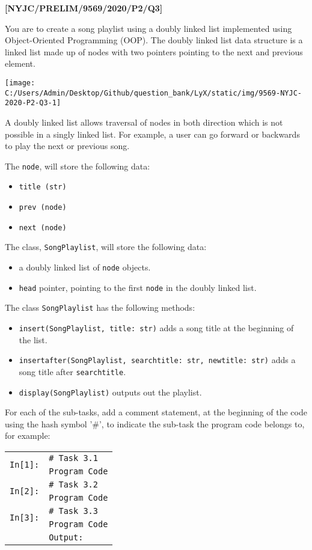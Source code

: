 \item \textbf{{[}NYJC/PRELIM/9569/2020/P2/Q3{]} }

You are to create a song playlist using a doubly linked list implemented
using Object-Oriented Programming (OOP). The doubly linked list data
structure is a linked list made up of nodes with two pointers pointing
to the next and previous element. 
\begin{center}
\texttt{[image: C:/Users/Admin/Desktop/Github/question\_bank/LyX/static/img/9569-NYJC-2020-P2-Q3-1]}
\par\end{center}

A doubly linked list allows traversal of nodes in both direction which
is not possible in a singly linked list. For example, a user can go
forward or backwards to play the next or previous song.

The \texttt{node}, will store the following data: 
\begin{itemize}
\item \texttt{title (str) }
\item \texttt{prev (node) }
\item \texttt{next (node)} 
\end{itemize}
The class, \texttt{SongPlaylist}, will store the following data: 
\begin{itemize}
\item a doubly linked list of \texttt{node} objects. 
\item \texttt{head} pointer, pointing to the first \texttt{node} in the
doubly linked list. 
\end{itemize}
The class \texttt{SongPlaylist} has the following methods: 
\begin{itemize}
\item \texttt{insert(SongPlaylist, title: str)} adds a song title at the
beginning of the list. 
\item \texttt{insertafter(SongPlaylist, searchtitle: str, newtitle: str)}
adds a song title after \texttt{searchtitle}.
\item \texttt{display(SongPlaylist)} outputs out the playlist. 
\end{itemize}
For each of the sub-tasks, add a comment statement, at the beginning
of the code using the hash symbol '\#', to indicate the sub-task the
program code belongs to, for example: 
\noindent \begin{center}
\begin{tabular}{c|l|}
\cline{2-2} 
\multirow{2}{*}{\texttt{In{[}1{]}:}} & \texttt{\# Task 3.1}\tabularnewline
 & \texttt{Program Code}\tabularnewline
\cline{2-2} 
\multirow{2}{*}{\texttt{In{[}2{]}:}} & \texttt{\# Task 3.2}\tabularnewline
 & \texttt{Program Code}\tabularnewline
\cline{2-2} 
\multirow{2}{*}{\texttt{In{[}3{]}:}} & \texttt{\# Task 3.3}\tabularnewline
 & \texttt{Program Code}\tabularnewline
\cline{2-2} 
\multicolumn{1}{c}{} & \multicolumn{1}{l}{\texttt{Output:}}\tabularnewline
\end{tabular}
\par\end{center}

